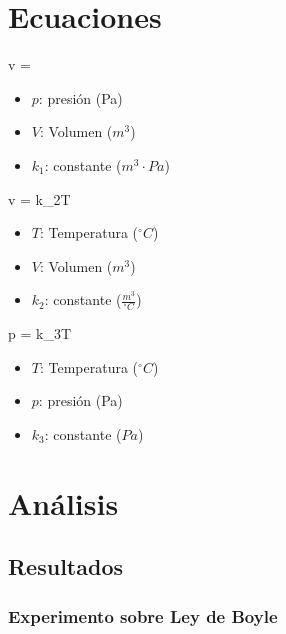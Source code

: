 \documentclass[12pt,a4paper]{config/myConfig}
\begin{document}
\section{Ecuaciones}
\label{sec:ECUACIONES}


\begin{EquationLab}
{v = }
{\begin{itemize}
    \item $p$: presión (Pa)
    \item $V$: Volumen ($m^3$)
    \item $k_1$: constante ($m^3 \cdot Pa$)
\end{itemize}}
\end{EquationLab}


\begin{EquationLab}
{v = k_2T}
{\begin{itemize}
    \item $T$: Temperatura ($^{\circ} C$)
    \item $V$: Volumen ($m^3$)
    \item $k_2$: constante ($\frac{m^3}{^{\circ} C}$)
\end{itemize}}
\end{EquationLab}

\begin{EquationLab}
{p = k_3T}
{\begin{itemize}
    \item $T$: Temperatura ($^{\circ} C$)
    \item $p$: presión (Pa)
    \item $k_3$: constante ($Pa$)
\end{itemize}}
\end{EquationLab}

\section{Análisis}
\label{sec:ANALISIS}

\subsection{Resultados}
\label{sec:RESULTADOS}

\subsubsection*{Experimento sobre Ley de Boyle}
\end{document}
